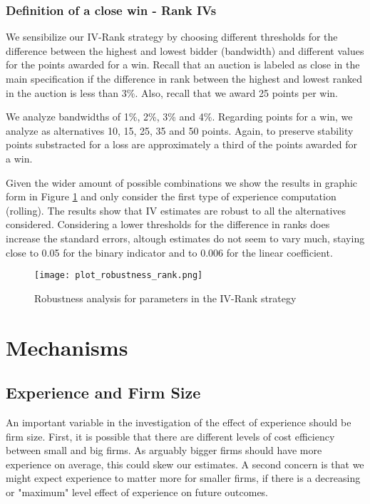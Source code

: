 

\subsection{Definition of a close win - Rank IVs}

We sensibilize our IV-Rank strategy by choosing different thresholds for the difference between the highest and lowest bidder (bandwidth) and different values for the points awarded for a win. Recall that an auction is labeled as close in the main specification if the difference in rank between the highest and lowest ranked in the auction is less than 3\%. Also, recall that we award 25 points per win.

We analyze bandwidths of 1\%, 2\%, 3\% and 4\%. Regarding points for a win, we analyze as alternatives 10, 15, 25, 35 and 50 points. Again, to preserve stability points substracted for a loss are approximately a third of the points awarded for a win.

Given the wider amount of possible combinations we show the results in graphic form in Figure \ref{fig:plot_robustness_rank} and only consider the first type of experience computation (rolling). The results show that IV estimates are robust to all the alternatives considered. Considering a lower thresholds for the difference in ranks does increase the standard errors, altough estimates do not seem to vary much, staying close to 0.05 for the binary indicator and to 0.006 for the linear coefficient.

\begin{figure}[H]
  \texttt{[image: plot\_robustness\_rank.png]}
  \caption{Robustness analysis for parameters in the IV-Rank strategy}
  \label{fig:plot_robustness_rank}
\end{figure}

\chapter{Mechanisms}

     \section{Experience and Firm Size}
     An important variable in the investigation of the effect of experience should be firm size. First, it is possible that there are different levels of cost efficiency between small and big firms. As arguably bigger firms should have more experience on average, this could skew our estimates. A second concern is that we might expect experience to matter more for smaller firms, if there is a decreasing or "maximum" level effect of experience on future outcomes.

